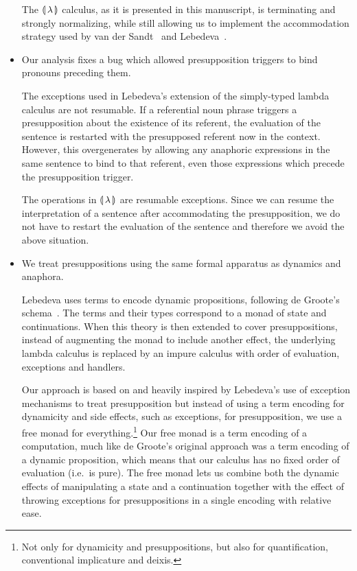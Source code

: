 \begin{itemize}
  The ${\llparenthesis \, \lambda \, \rrparenthesis}$ calculus, as it is presented in this manuscript, is
  terminating and strongly normalizing, while still allowing us to
  implement the accommodation strategy used by van der
  Sandt~\cite{van1992presupposition} and
  Lebedeva~\cite{lebedeva2012expression}.

\item Our analysis fixes a bug which allowed presupposition triggers to
  bind pronouns preceding them.

  The exceptions used in Lebedeva's extension of the simply-typed lambda
  calculus are not resumable. If a referential noun phrase triggers a
  presupposition about the existence of its referent, the evaluation of the
  sentence is restarted with the presupposed referent now in the
  context. However, this overgenerates by allowing any anaphoric
  expressions in the same sentence to bind to that referent, even those
  expressions which precede the presupposition trigger.

  \begin{exe}
  \end{exe}

  The operations in ${\llparenthesis \, \lambda \, \rrparenthesis}$ are resumable exceptions. Since we can resume
  the interpretation of a sentence after accommodating the presupposition,
  we do not have to restart the evaluation of the sentence and therefore we
  avoid the above situation.

\item We treat presuppositions using the same formal apparatus as dynamics
  and anaphora.

  Lebedeva uses terms to encode dynamic propositions, following de Groote's
  schema~\cite{de2006towards}. The terms and their types correspond to a
  monad of state and continuations. When this theory is then extended to
  cover presuppositions, instead of augmenting the monad to include another
  effect, the underlying lambda calculus is replaced by an impure calculus
  with order of evaluation, exceptions and handlers.

  Our approach is based on and heavily inspired by Lebedeva's use of
  exception mechanisms to treat presupposition but instead of using a term
  encoding for dynamicity and side effects, such as exceptions, for
  presupposition, we use a free monad for everything.\footnote{Not only for
    dynamicity and presuppositions, but also for quantification,
    conventional implicature and deixis.} Our free monad is a term encoding
  of a computation, much like de Groote's original approach was a term
  encoding of a dynamic proposition, which means that our calculus has no
  fixed order of evaluation (i.e.\ is pure). The free monad lets us combine
  both the dynamic effects of manipulating a state and a continuation
  together with the effect of throwing exceptions for presuppositions in a
  single encoding with relative ease.
\end{itemize}


